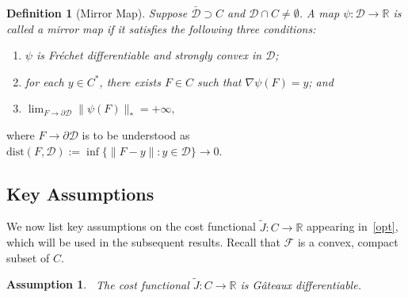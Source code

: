 \documentclass[11pt,leqno]{amsart}
\newtheorem{definition}{Definition}
\newtheorem{assumption}{Assumption}
\newtheorem{lemma}{Lemma}
\begin{document}
\begin{definition}[Mirror Map] \label{def:mirror} Suppose $\bar{\mathcal{D}} \supset C$ and $\mathcal{D} \cap C \neq \emptyset$. A map $\psi: \mathcal{D} \to \mathbb{R}$ is called a \emph{mirror map} if it satisfies the following three conditions: \begin{enumerate} \item $\psi$ is Fr\'{e}chet differentiable and strongly convex in $\mathcal{D}$; \item for each $y \in C^*$, there exists $F \in C$ such that $\nabla \psi (F) = y$; and \item $\lim_{F \to \partial \mathcal{D}} \|\psi(F)\|_* = +\infty,$ \end{enumerate}
\end{definition} where $F \to \partial \mathcal{D}$ is to be understood as $\mbox{dist}(F,\mathcal{D}) := \inf\{\|F-y\|: y \in \mathcal{D}\} \to 0.$

 
% 

\subsection{Key Assumptions}
We now list key assumptions on the cost functional $\tilde J : C \to \mathbb R$ appearing in~\eqref{opt}, which will be used in the subsequent results. Recall that $\mathcal F$ is a convex, compact subset of $C$. 

% 
\begin{assumption}~\label{ass:tildeJ}
    The cost functional $\tilde J : C \to \mathbb R$ is G\^{a}teaux differentiable.
\end{assumption}
\end{document}
